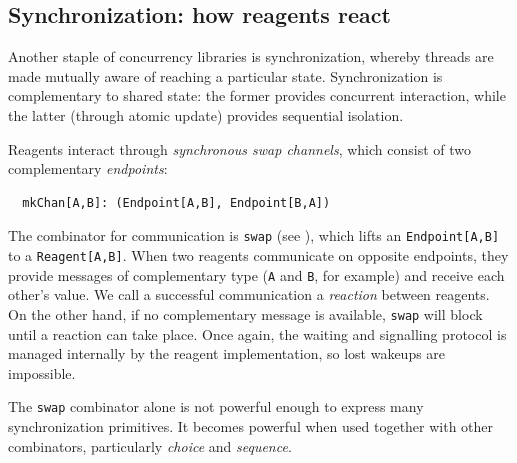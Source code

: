 \documentclass[preprint]{sigplanconf}
\begin{document}

\subsection{Synchronization: how reagents react}


Another staple of concurrency libraries is synchronization, whereby
threads are made mutually aware of reaching a particular state.
Synchronization is complementary to shared state: the former
provides concurrent interaction, while the latter (through atomic
update) provides sequential isolation.  %

Reagents interact through \emph{synchronous swap channels}, which
consist of two complementary \emph{endpoints}:
\begin{lstlisting}
  mkChan[A,B]: (Endpoint[A,B], Endpoint[B,A])
\end{lstlisting}
The combinator for communication is \lstinline{swap} (see
), which lifts an \lstinline{Endpoint[A,B]} to a
\lstinline{Reagent[A,B]}.  When two reagents communicate on opposite
endpoints, they provide messages of complementary type (\lstinline{A}
and \lstinline{B}, for example) and receive each other's value.  We
call a successful communication a \emph{reaction} between reagents.
On the other hand, if no complementary message is available,
\lstinline{swap} will block until a reaction can take place.  Once
again, the waiting and signalling protocol is managed internally by
the reagent implementation, so lost wakeups are impossible.

The \lstinline{swap} combinator alone is not powerful enough to
express many synchronization primitives.  It becomes powerful when
used together with other combinators, particularly \emph{choice} and
\emph{sequence}.

\end{document}
